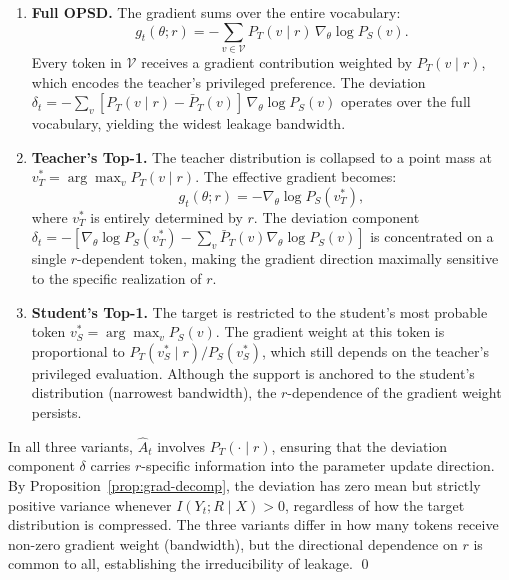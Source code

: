 \documentclass[]{jingdong}
\begin{document}
\begin{enumerate}[label=(\roman*)]
    \item \textbf{Full OPSD.} The gradient sums over the entire vocabulary:
    \begin{equation}
        g_t(\theta; r) = -\sum_{v \in \mathcal{V}} P_T(v \mid r)\, \nabla_\theta \log P_S(v).
    \end{equation}
    Every token in $\mathcal{V}$ receives a gradient contribution weighted by $P_T(v \mid r)$, which encodes the teacher's privileged preference. The deviation $\delta_t = -\sum_v [P_T(v \mid r) - \bar{P}_T(v)]\, \nabla_\theta \log P_S(v)$ operates over the full vocabulary, yielding the widest leakage bandwidth.

    \item \textbf{Teacher's Top-1.} The teacher distribution is collapsed to a point mass at $v^*_T = \arg\max_v P_T(v \mid r)$. The effective gradient becomes:
    \begin{equation}
        g_t(\theta; r) = -\nabla_\theta \log P_S(v^*_T),
    \end{equation}
    where $v^*_T$ is entirely determined by $r$. The deviation component $\delta_t = -[\nabla_\theta \log P_S(v^*_T) - \sum_v \bar{P}_T(v) \nabla_\theta \log P_S(v)]$ is concentrated on a single $r$-dependent token, making the gradient direction maximally sensitive to the specific realization of $r$.

    \item \textbf{Student's Top-1.} The target is restricted to the student's most probable token $v^*_S = \arg\max_v P_S(v)$. The gradient weight at this token is proportional to $P_T(v^*_S \mid r) / P_S(v^*_S)$, which still depends on the teacher's privileged evaluation. Although the support is anchored to the student's distribution (narrowest bandwidth), the $r$-dependence of the gradient weight persists.
\end{enumerate}

In all three variants, $\hat{A}_t$ involves $P_T(\cdot \mid r)$, ensuring that the deviation component $\delta$ carries $r$-specific information into the parameter update direction. By Proposition~\ref{prop:grad-decomp}, the deviation has zero mean but strictly positive variance whenever $I(Y_t; R \mid X) > 0$, regardless of how the target distribution is compressed. The three variants differ in how many tokens receive non-zero gradient weight (bandwidth), but the directional dependence on $r$ is common to all, establishing the irreducibility of leakage. \qed
\end{document}
